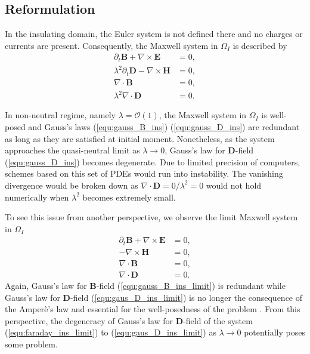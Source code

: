 \documentclass{article}
\begin{document}
\subsection{Reformulation}
In the insulating domain, the Euler system is not defined there and no charges or currents are present. Consequently, the Maxwell system in $\Omega_I$ is described by    
\begin{align}
    \partial_t \mathbf{B} + \nabla \times \mathbf{E} &= 0, \label{equ:faraday_ins}\\ 
    \lambda^2 \partial_t \mathbf{D} - \nabla \times \mathbf{H} &= 0,  \label{equ:ampere_ins}\\
    \nabla \cdot \mathbf{B} &= 0, \label{equ:gauss_B_ins}\\
    \lambda^2 \nabla \cdot \mathbf{D} &= 0 \label{equ:gauss_D_ins}.
\end{align}

In non-neutral regime, namely $\lambda = \mathcal{O}(1)$, the Maxwell system in $\Omega_I$ is well-posed and Gauss's laws (\ref{equ:gauss_B_ins}) (\ref{equ:gauss_D_ins}) are redundant as long as they are satisfied at initial moment. Nonetheless, as the system approaches the quasi-neutral limit as $\lambda \rightarrow 0$, Gauss's law for $\mathbf{D}$-field (\ref{equ:gauss_D_ins}) becomes degenerate. Due to limited precision of computers, schemes based on this set of PDEs would run into instability. The vanishing divergence would be broken down as $\nabla \cdot \mathbf{D} = 0/\lambda^2 = 0$ would not hold numerically when $\lambda^2$ becomes extremely small. 

To see this issue from another perspective, we observe the limit Maxwell system in $\Omega_I$
\begin{align}
    \partial_t \mathbf{B} + \nabla \times \mathbf{E} &= 0, \label{equ:faraday_ins_limit}\\ 
    - \nabla \times \mathbf{H} &= 0,  \label{equ:ampere_ins_limit}\\
    \nabla \cdot \mathbf{B} &= 0, \label{equ:gauss_B_ins_limit}\\
    \nabla \cdot \mathbf{D} &= 0 \label{equ:gaus_D_ins_limit}.
\end{align}
Again, Gauss's law for $\mathbf{B}$-field (\ref{equ:gauss_B_ins_limit}) is redundant while Gauss's law for $\mathbf{D}$-field (\ref{equ:gaus_D_ins_limit}) is no longer the consequence of the Amper\`{e}'s law and essential for the well-posedness of the problem \citep{ana_2010}. From this perspective, the degeneracy of Gauss's law for $\mathbf{D}$-field of the system (\ref{equ:faraday_ins_limit}) to (\ref{equ:gaus_D_ins_limit}) as $\lambda \rightarrow 0$ potentially poses some problem.
\end{document}
